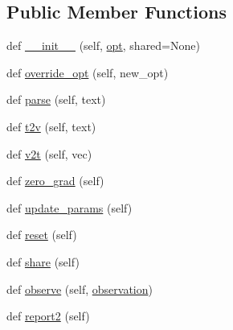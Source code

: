 \subsection*{Public Member Functions}
\begin{DoxyCompactItemize}
\item 
def \hyperlink{classprojects_1_1personachat_1_1kvmemnn_1_1kvmemnn_1_1KvmemnnAgent_ab1b2afa2c94021384b2f749e7441f588}{\+\_\+\+\_\+init\+\_\+\+\_\+} (self, \hyperlink{classprojects_1_1personachat_1_1kvmemnn_1_1kvmemnn_1_1KvmemnnAgent_a4e25d0aaf32c5bcc9429c6825ba214c4}{opt}, shared=None)
\item 
def \hyperlink{classprojects_1_1personachat_1_1kvmemnn_1_1kvmemnn_1_1KvmemnnAgent_aa0f3a677ef0e7d3d0f573b98bc0eed9d}{override\+\_\+opt} (self, new\+\_\+opt)
\item 
def \hyperlink{classprojects_1_1personachat_1_1kvmemnn_1_1kvmemnn_1_1KvmemnnAgent_a080532403c383e18fff08420558ecccf}{parse} (self, text)
\item 
def \hyperlink{classprojects_1_1personachat_1_1kvmemnn_1_1kvmemnn_1_1KvmemnnAgent_a0c38fac50edaf23833de870e37bccb97}{t2v} (self, text)
\item 
def \hyperlink{classprojects_1_1personachat_1_1kvmemnn_1_1kvmemnn_1_1KvmemnnAgent_a07a7ef79c4bae6151aad5b7b765be9bc}{v2t} (self, vec)
\item 
def \hyperlink{classprojects_1_1personachat_1_1kvmemnn_1_1kvmemnn_1_1KvmemnnAgent_a7c6b549658b7ee5148af60c180e803b1}{zero\+\_\+grad} (self)
\item 
def \hyperlink{classprojects_1_1personachat_1_1kvmemnn_1_1kvmemnn_1_1KvmemnnAgent_a9760c8b1b1b905f09de43413ad51a69b}{update\+\_\+params} (self)
\item 
def \hyperlink{classprojects_1_1personachat_1_1kvmemnn_1_1kvmemnn_1_1KvmemnnAgent_aedce45a699479a98d38bcb78b36dd1ea}{reset} (self)
\item 
def \hyperlink{classprojects_1_1personachat_1_1kvmemnn_1_1kvmemnn_1_1KvmemnnAgent_a713175baa1cbbcb147c34ec1bac8f77a}{share} (self)
\item 
def \hyperlink{classprojects_1_1personachat_1_1kvmemnn_1_1kvmemnn_1_1KvmemnnAgent_af64ed055aff5efbdea21ce93c18c221a}{observe} (self, \hyperlink{classprojects_1_1personachat_1_1kvmemnn_1_1kvmemnn_1_1KvmemnnAgent_afd7921cc7a7e9aa7a8d3a454cf6d6176}{observation})
\item 
def \hyperlink{classprojects_1_1personachat_1_1kvmemnn_1_1kvmemnn_1_1KvmemnnAgent_a4b5b1dd2efa6f00f39f773f0b48edfc7}{report2} (self)
\item 

\end{DoxyCompactItemize}
